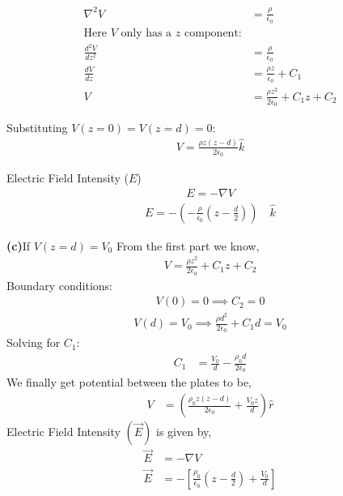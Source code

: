 \documentclass{article}
\begin{document}
\begin{align*}
    \nabla^2 V &= \frac{\rho}{\epsilon_0} \\
    \text{Here } V \text{ only has a } z \text{ component:} \\
    \frac{d^2 V}{dz^2} &= \frac{\rho}{\epsilon_0} \\
    \frac{dV}{dz} &= \frac{\rho z}{\epsilon_0} + C_1 \\
    V &= \frac{\rho z^2}{2 \epsilon_0} + C_1 z + C_2
\end{align*}

Substituting $ V(z=0) = V(z=d) = 0 $:
\begin{align*}
V = \frac{\rho z (z-d)}{2 \epsilon_0}\hat{k}
\end{align*}

Electric Field Intensity ($E$)
\begin{align*}
E = -\nabla V
\end{align*}
\begin{align*}
E = -\left(-\frac{\rho}{\epsilon_0} \left(z - \frac{d}{2}\right)\right) \quad \hat{k}
\end{align*}

\textbf{(c)}If $V(z=d) = V_0$\newline
From the first part we know,
\begin{align*}
V = \frac{\rho z^2}{2 \epsilon_0} + C_1 z + C_2
\end{align*}
Boundary conditions:
\begin{align*}
V(0) = 0 \implies C_2 = 0
\end{align*}
\begin{align*}
V(d) = V_0 \implies \frac{\rho d^2}{2 \epsilon_0} + C_1 d = V_0
\end{align*}
Solving for $C_1:$
\begin{align*}
C_1 &= \frac{V_0}{d} - \frac{\rho_0 d}{2 \epsilon_0}
\end{align*}
We finally get potential between the plates to be,
\begin{align*}
V &= \left( \frac{\rho_0 z (z-d)}{2 \epsilon_0} + \frac{V_0 z}{d} \right) \hat{r}
\end{align*}
Electric Field Intensity $(\vec{E})$ is given by,
\begin{align*}
\vec{E} &= -\nabla V \\
\vec{E} &= -\left[ \frac{\rho_0}{\epsilon_0} \left( z - \frac{d}{2} \right) + \frac{V_0}{d} \right]
\end{align*}
\end{document}
